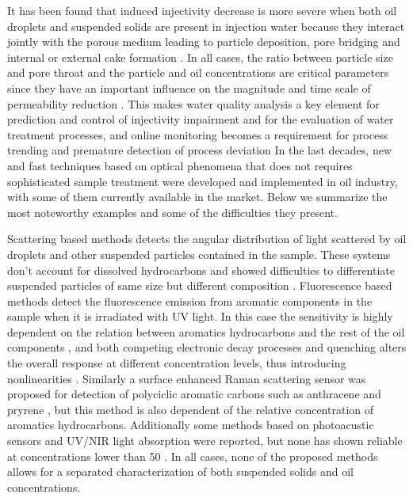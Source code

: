 \documentclass[9pt,twocolumn,twoside]{osajnl}
\begin{document}
It has been found that induced injectivity decrease is more severe when both oil droplets and suspended solids are present in injection water because they interact jointly with the porous medium leading to particle deposition, pore bridging and internal or external cake formation \cite{Bennion1998,Chaveteau1998,Reousseau2008,Ali2009}. In all cases, the ratio between particle size and pore throat and the particle and oil concentrations are critical parameters since they have an important influence on the magnitude and time scale of permeability reduction \cite{vanderBroek1999,Ali2007,Buret2010}. This makes water quality analysis a key element for prediction and control of injectivity impairment and for the evaluation of water treatment processes, and online monitoring becomes a requirement for process trending and premature detection of process deviation In the last decades, new and fast techniques based on optical phenomena that does not requires sophisticated sample treatment were developed and implemented in oil industry, with some of them currently available in the market. Below we summarize the most noteworthy examples and some of the difficulties they present.


Scattering based methods detects the angular distribution of light scattered by oil droplets and other suspended particles contained in the sample. These systems don't account for dissolved hydrocarbons and showed difficulties to differentiate suspended particles of same size but different composition \cite{He2003}. Fluorescence based methods detect the fluorescence emission from aromatic components in the sample when it is irradiated with UV light. In this case the sensitivity is highly dependent on the relation between aromatics hydrocarbons and the rest of the oil components \cite[ch. 4]{Parker1987}, and both competing electronic decay processes and quenching alters the overall response at different concentration levels, thus introducing nonlinearities \cite{Downare1995}. Similarly a surface enhanced Raman scattering sensor was proposed for detection of polyciclic aromatic carbons such as anthracene and pryrene \cite{Kolomijeca2011}, but this method is also dependent of the relative concentration of aromatics hydrocarbons. Additionally some methods based on photoacustic sensors and UV/NIR light absorption were reported, but none has shown reliable at concentrations lower than \SI{50}{\ppm} \cite{Freeborn1998,He2003}. In all cases, none of the proposed methods allows for a separated characterization of both suspended solids and oil concentrations.
\end{document}
